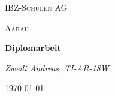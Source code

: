 \begin{titlepage}
    \centering
    {\scshape\LARGE IBZ-Schulen AG\par}
    {\scshape\Large Aarau\par}
    \vspace{1.5cm}
    {\huge\bfseries Diplomarbeit\par}
    \vspace{2cm}
    {\Large\itshape Zweili Andreas, TI-AR-18W\par}
    \vfill

    {\large \today\par}
\thispagestyle{empty}
\end{titlepage}
